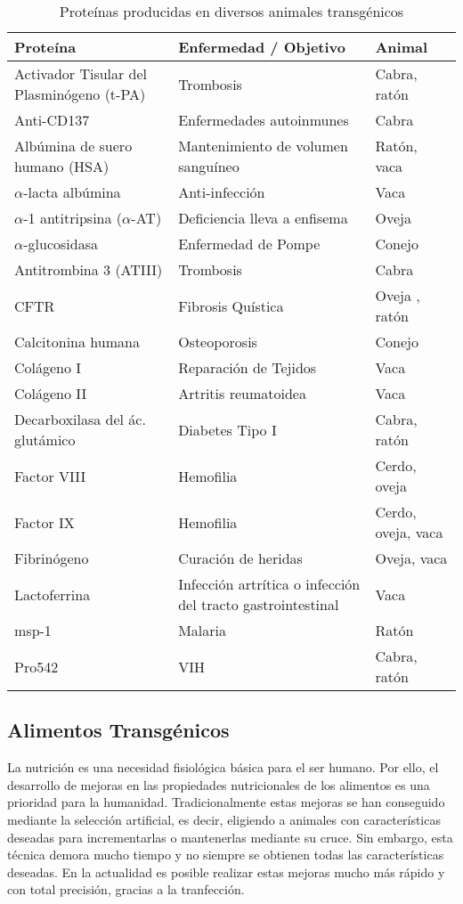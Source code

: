 \documentclass[fleqn,10pt]{SelfArx} %
\begin{document}
\begin{table*}[t!]
\centering
\begin{tabular}{l l l} \toprule
\textbf{Proteína} & \textbf{Enfermedad / Objetivo} & \textbf{Animal} \\ \hline
Activador Tisular del Plasminógeno (t-PA) &Trombosis & Cabra, ratón \\ 
Anti-CD137 & Enfermedades autoinmunes & Cabra \\ 
Albúmina de suero humano (HSA) & Mantenimiento de volumen sanguíneo & Ratón, vaca \\
$\alpha$-lacta albúmina & Anti-infección & Vaca \\
$\alpha$-1 antitripsina ($\alpha$-AT) & Deficiencia lleva a enfisema & Oveja \\
$\alpha$-glucosidasa & Enfermedad de Pompe & Conejo \\
Antitrombina 3 (ATIII) & Trombosis & Cabra \\
CFTR & Fibrosis Quística & Oveja , ratón \\ 
Calcitonina humana & Osteoporosis & Conejo \\ 
Colágeno I & Reparación de Tejidos & Vaca \\ 
Colágeno II & Artritis reumatoidea & Vaca \\ 
Decarboxilasa del ác. glutámico & Diabetes Tipo I & Cabra, ratón \\
Factor VIII & Hemofilia & Cerdo, oveja \\ 
Factor IX & Hemofilia & Cerdo, oveja, vaca \\
Fibrinógeno & Curación de heridas & Oveja, vaca \\
Lactoferrina & Infección artrítica o infección del tracto gastrointestinal & Vaca \\ 
msp-1 & Malaria & Ratón \\
Pro542 & VIH & Cabra, ratón \\ \bottomrule
\end{tabular}

\caption{Proteínas producidas en diversos animales transgénicos \cite{Koszarycz2004, niemann2007transgenic, houdebine2009production}}
\label{cuadro1}
\end{table*}


\subsection{Alimentos Transgénicos}

La nutrición es una necesidad fisiológica básica para el ser humano\cite{maslow1943theory}. Por ello, el desarrollo de mejoras en las propiedades nutricionales de los alimentos es una prioridad para la humanidad. Tradicionalmente estas mejoras se han conseguido mediante la selección artificial, es decir, eligiendo a animales con características deseadas para incrementarlas o mantenerlas mediante su cruce. Sin embargo, esta técnica demora mucho tiempo y no siempre se obtienen todas las características deseadas. En la actualidad es posible realizar estas mejoras mucho más rápido y con total precisión, gracias a la tranfección.
\end{document}
